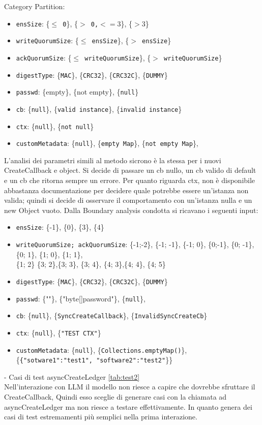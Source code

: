 \documentclass[10pt]{article}
\begin{document}
{		Category Partition:
		\begin{itemize}[label=--, itemsep=2pt, parsep=0pt]
			\item \texttt{ensSize}: \{\texttt{$\le$ 0}\}, \{\texttt{$>$ 0,$<=3$}\}, \{\texttt{$>3$}\}
			\item \texttt{writeQuorumSize}: \{\texttt{$\le$ ensSize}\}, \{\texttt{$>$ ensSize}\}
			\item \texttt{ackQuorumSize}: \{\texttt{$\le$ writeQuorumSize}\}, \{\texttt{$>$ writeQuorumSize}\}
			\item \texttt{digestType}: \{\texttt{MAC}\}, \{\texttt{CRC32}\}, \{\texttt{CRC32C}\}, \{\texttt{DUMMY}\}
			\item \texttt{passwd}: \{empty\}, \{not empty\}, \{\texttt{null}\}
			\item \texttt{cb}:  \{\texttt{null}\}, \{\texttt{valid instance}\}, \{\texttt{invalid instance}\}
			\item \texttt{ctx}:  \{\texttt{null}\}, \{\texttt{not null}\}
			\item \texttt{customMetadata}:  \{\texttt{null}\}, \{\texttt{empty Map}\}, \{\texttt{not empty Map}\},
		\end{itemize}
		L'analisi dei parametri simili al metodo sicrono è la stessa per i nuovi CreateCallback e object. Si decide di passare un cb nullo, un cb valido di default e un cb che ritorna sempre un errore. Per quanto riguarda ctx, non è disponibile abbastanza documentazione per decidere quale potrebbe essere un'istanza non valida; quindi si decide di osservare il comportamento con un'istanza nulla e un new Object vuoto.
		Dalla Boundary analysis condotta si ricavano i seguenti input:
		\begin{itemize}[label=--, itemsep=2pt, parsep=0pt]
			\item \texttt{ensSize}: \{-1\}, \{0\}, \{3\}, \{4\}
			\item \texttt{writeQuorumSize; ackQuorumSize}: 
			\{-1;-2\}, \{-1; -1\}, \{-1; 0\},
			\{0;-1\}, \{0; -1\}, \{0; 1\},
			\{1; 0\}, \{1; 1\},\\ \{1; 2\}
			\{3; 2\},\{3; 3\}, \{3; 4\},
			\{4; 3\},\{4; 4\}, \{4; 5\}
			\item \texttt{digestType}: \{\texttt{MAC}\}, \{\texttt{CRC32}\}, \{\texttt{CRC32C}\}, \{\texttt{DUMMY}\}
			\item \texttt{passwd}: \{""\}, \{"byte[]password"\}, \{\texttt{null}\},
			\item \texttt{cb}:  \{\texttt{null}\}, \{\texttt{SyncCreateCallback}\}, \{\texttt{InvalidSyncCreateCb}\}
			\item \texttt{ctx}:  \{\texttt{null}\}, \{\texttt{"TEST CTX"}\}
			\item \texttt{customMetadata}:  \{\texttt{null}\},  \{\texttt{Collections.emptyMap()}\}, \{\texttt{\{"sotware1":"test1", "software2":"test2"}\}\}
		\end{itemize}
		- Casi di test asyncCreateLedger \autoref{tab:test2}\\
		Nell'interazione con LLM il modello non riesce a capire che dovrebbe sfruttare il CreateCallback,
		Quindi esso sceglie di generare casi con la chiamata ad asyncCreateLedger ma non riesce a testare effettivamente. In quanto genera dei casi di test estremamenti più semplici nella prima interazione.
		
}
\end{document}
